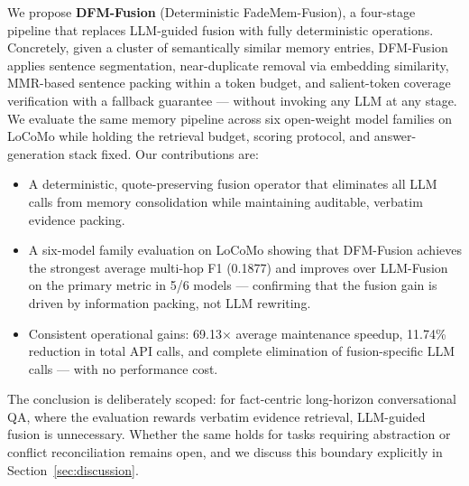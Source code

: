 We propose \textbf{DFM-Fusion} (Deterministic FadeMem-Fusion), a four-stage pipeline that replaces LLM-guided fusion with fully deterministic operations.
Concretely, given a cluster of semantically similar memory entries, DFM-Fusion applies sentence segmentation, near-duplicate removal via embedding similarity, MMR-based sentence packing within a token budget, and salient-token coverage verification with a fallback guarantee --- without invoking any LLM at any stage.
We evaluate the same memory pipeline across six open-weight model families on LoCoMo while holding the retrieval budget, scoring protocol, and answer-generation stack fixed.
Our contributions are:
\begin{itemize}
    \item A deterministic, quote-preserving fusion operator that eliminates all LLM calls from memory consolidation while maintaining auditable, verbatim evidence packing.
    \item A six-model family evaluation on LoCoMo showing that DFM-Fusion achieves the strongest average multi-hop F1 (0.1877) and improves over LLM-Fusion on the primary metric in 5/6 models --- confirming that the fusion gain is driven by information packing, not LLM rewriting.
    \item Consistent operational gains: 69.13$\times$ average maintenance speedup, 11.74\% reduction in total API calls, and complete elimination of fusion-specific LLM calls --- with no performance cost.
\end{itemize}

The conclusion is deliberately scoped: for fact-centric long-horizon conversational QA, where the evaluation rewards verbatim evidence retrieval, LLM-guided fusion is unnecessary.
Whether the same holds for tasks requiring abstraction or conflict reconciliation remains open, and we discuss this boundary explicitly in Section~\ref{sec:discussion}.
